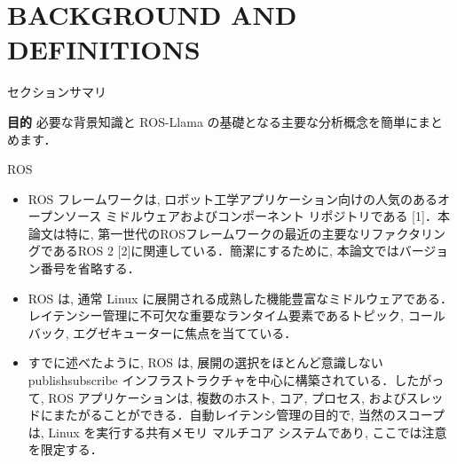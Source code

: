 
\section{BACKGROUND AND DEFINITIONS}
\label{sec: background and definitions}

\begin{frame}{セクションサマリ}
    \begin{itembox}[l]{\textbf{目的}}
        必要な背景知識と ROS-Llama の基礎となる主要な分析概念を簡単にまとめます．
    \end{itembox}
\end{frame}

\begin{frame}{ROS}
    \begin{itemize}
        \item ROS フレームワークは, ロボット工学アプリケーション向けの人気のあるオープンソース ミドルウェアおよびコンポーネント リポジトリである [1]．本論文は特に, 第一世代のROSフレームワークの最近の主要なリファクタリングであるROS 2 [2]に関連している．簡潔にするために, 本論文ではバージョン番号を省略する．
    \end{itemize}
\end{frame}

\begin{frame}{}
    \begin{itemize}
        \item ROS は, 通常 Linux に展開される成熟した機能豊富なミドルウェアである．レイテンシー管理に不可欠な重要なランタイム要素であるトピック, コールバック, エグゼキューターに焦点を当てている．
    \end{itemize}
\end{frame}

\begin{frame}{}
    \begin{itemize}
        \item すでに述べたように, ROS は, 展開の選択をほとんど意識しない publishsubscribe インフラストラクチャを中心に構築されている．したがって, ROS アプリケーションは, 複数のホスト, コア, プロセス, およびスレッドにまたがることができる．自動レイテンシ管理の目的で, 当然のスコープは, Linux を実行する共有メモリ マルチコア システムであり, ここでは注意を限定する．
    \end{itemize}
\end{frame}

